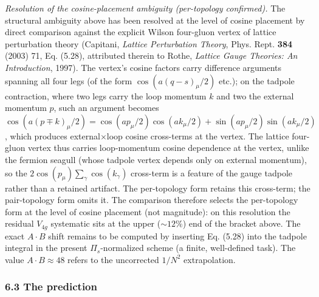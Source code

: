 \documentclass[
]{article}
\begin{document}
\emph{Resolution of the cosine-placement ambiguity (per-topology
confirmed).} The structural ambiguity above has been resolved at the
level of cosine placement by direct comparison against the explicit
Wilson four-gluon vertex of lattice perturbation theory (Capitani,
\emph{Lattice Perturbation Theory}, Phys. Rept. \textbf{384} (2003) 71,
Eq. (5.28), attributed therein to Rothe, \emph{Lattice Gauge Theories:
An Introduction}, 1997). The vertex's cosine factors carry difference
arguments spanning all four legs (of the form \(\cos(a(q-s)_\mu/2)\)
etc.); on the tadpole contraction, where two legs carry the loop
momentum \(k\) and two the external momentum \(p\), such an argument
becomes
\(\cos(a(p\mp k)_\mu/2) = \cos(ap_\mu/2)\cos(ak_\mu/2) + \sin(ap_\mu/2)\sin(ak_\mu/2)\),
which produces external\(\times\)loop cosine cross-terms at the vertex.
The lattice four-gluon vertex thus carries loop-momentum cosine
dependence at the vertex, unlike the fermion seagull (whose tadpole
vertex depends only on external momentum), so the
\(2\cos(p_\mu)\sum_\gamma \cos(k_\gamma)\) cross-term is a feature of
the gauge tadpole rather than a retained artifact. The per-topology form
retains this cross-term; the pair-topology form omits it. The comparison
therefore selects the per-topology form at the level of cosine placement
(not magnitude): on this resolution the residual \(V_{4g}\) systematic
sits at the upper (\(\sim 12\%\)) end of the bracket above. The exact
\(A\cdot B\) shift remains to be computed by inserting Eq. (5.28) into
the tadpole integral in the present \(\Pi_s\)-normalized scheme (a
finite, well-defined task). The value \(A \cdot B \approx 48\) refers to
the uncorrected \(1/N^2\) extrapolation.

\hypertarget{the-prediction}{%
\subsubsection{6.3 The prediction}\label{the-prediction}}
\end{document}
